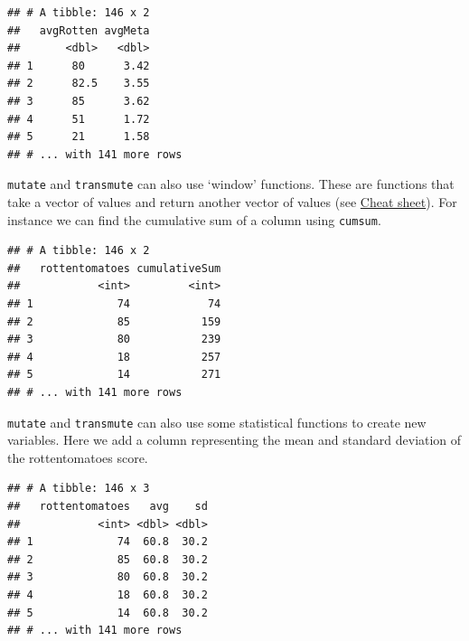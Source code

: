 \documentclass[
]{book}
\newenvironment{Shaded}{\begin{snugshade}}{\end{snugshade}}
\newcommand{\DataTypeTok}[1]{\textcolor[rgb]{0.13,0.29,0.53}{#1}}
\newcommand{\KeywordTok}[1]{\textcolor[rgb]{0.13,0.29,0.53}{\textbf{#1}}}
\newcommand{\NormalTok}[1]{#1}
\newcommand{\OperatorTok}[1]{\textcolor[rgb]{0.81,0.36,0.00}{\textbf{#1}}}
\newcommand{\StringTok}[1]{\textcolor[rgb]{0.31,0.60,0.02}{#1}}
\theoremstyle{definition}
\theoremstyle{definition}
\theoremstyle{definition}
\theoremstyle{remark}
\begin{document}
\begin{verbatim}
## # A tibble: 146 x 2
##   avgRotten avgMeta
##       <dbl>   <dbl>
## 1      80      3.42
## 2      82.5    3.55
## 3      85      3.62
## 4      51      1.72
## 5      21      1.58
## # ... with 141 more rows
\end{verbatim}

\texttt{mutate} and \texttt{transmute} can also use `window' functions. These are functions that take a vector of values and return another vector of values (see \href{https://www.rstudio.com/wp-content/uploads/2015/02/data-wrangling-cheatsheet.pdf}{Cheat sheet}). For instance we can find the cumulative sum of a column using \texttt{cumsum}.

\begin{Shaded}
\end{Shaded}

\begin{verbatim}
## # A tibble: 146 x 2
##   rottentomatoes cumulativeSum
##            <int>         <int>
## 1             74            74
## 2             85           159
## 3             80           239
## 4             18           257
## 5             14           271
## # ... with 141 more rows
\end{verbatim}

\texttt{mutate} and \texttt{transmute} can also use some statistical functions to create new variables. Here we add a column representing the mean and standard deviation of the rottentomatoes score.

\begin{Shaded}
\end{Shaded}

\begin{verbatim}
## # A tibble: 146 x 3
##   rottentomatoes   avg    sd
##            <int> <dbl> <dbl>
## 1             74  60.8  30.2
## 2             85  60.8  30.2
## 3             80  60.8  30.2
## 4             18  60.8  30.2
## 5             14  60.8  30.2
## # ... with 141 more rows
\end{verbatim}
\end{document}
